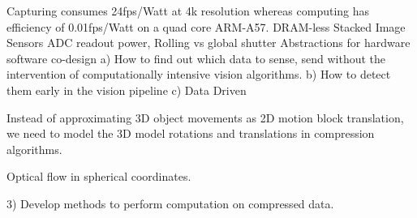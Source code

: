 








Capturing consumes 24fps/Watt at 4k resolution whereas computing has efficiency of 0.01fps/Watt on a quad core ARM-A57.
DRAM-less
Stacked Image Sensors
ADC readout power, Rolling vs global shutter
Abstractions for hardware software co-design
a) How to find out which data to sense, send without the intervention of computationally intensive vision algorithms.
b) How to detect them early in the vision pipeline
c) Data Driven 




Instead of approximating 3D object movements as 2D motion block translation, we need to model the 3D model rotations and translations in compression algorithms.

Optical flow in spherical coordinates.
	
3) 
Develop methods to perform computation on compressed data.


